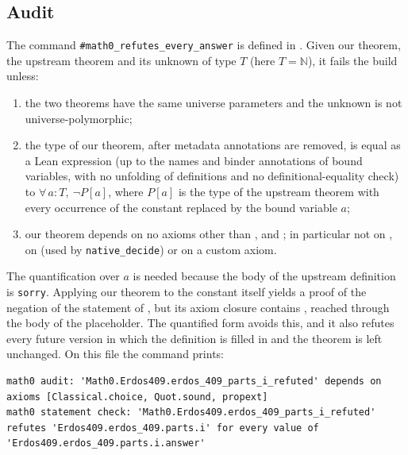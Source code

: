 \documentclass[11pt]{amsart}
\theoremstyle{plain}
\theoremstyle{definition}
\newcommand{\N}{\mathbb{N}}
\begin{document}
\subsection*{Audit}
The command \texttt{\#math0\_refutes\_every\_answer} is defined in . Given our theorem, the upstream theorem  and its unknown  of type $T$ (here $T=\N$), it fails the build unless:
\begin{enumerate}
\item the two theorems have the same universe parameters and the unknown is not universe-polymorphic;
\item the type of our theorem, after metadata annotations are removed, is equal as a Lean expression (up to the names and binder annotations of bound variables, with no unfolding of definitions and no definitional-equality check) to $\forall\, a : T,\ \neg P[a]$, where $P[a]$ is the type of the upstream theorem with every occurrence of the constant  replaced by the bound variable $a$;
\item our theorem depends on no axioms other than ,  and ; in particular not on , on  (used by \texttt{native\_decide}) or on a custom axiom.
\end{enumerate}
The quantification over $a$ is needed because the body of the upstream definition is \texttt{sorry}. Applying our theorem to the constant itself yields a proof of the negation of the statement of , but its axiom closure contains , reached through the body of the placeholder. The quantified form avoids this, and it also refutes every future version in which the definition is filled in and the theorem is left unchanged. On this file the command prints:
\begin{lstlisting}
math0 audit: 'Math0.Erdos409.erdos_409_parts_i_refuted' depends on axioms [Classical.choice, Quot.sound, propext]
math0 statement check: 'Math0.Erdos409.erdos_409_parts_i_refuted' refutes 'Erdos409.erdos_409.parts.i' for every value of 'Erdos409.erdos_409.parts.i.answer'
\end{lstlisting}
\end{document}
